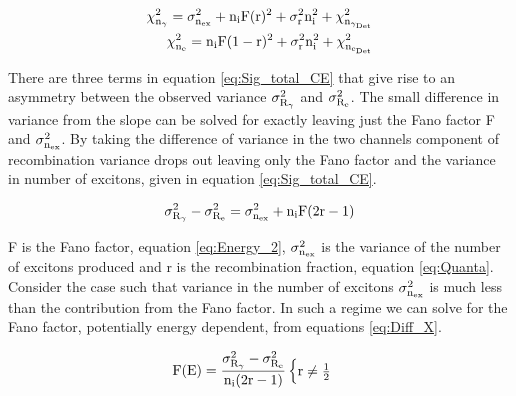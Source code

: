  
\begin{equation}
\begin{split}
\rm \chi_{n_\gamma}^2 = \sigma_{n_{ex}}^2 + n_iF(r)^2 + \sigma_{r}^2 n_i^2 + \chi_{n_{\gamma_{Det}}}^2 \\
\rm \chi_{n_e}^2  = n_iF(1-r)^2 + \sigma_{r}^2 n_i^2 + \chi_{n_{e_{Det}}}^2
\label{eq:Sig_total_CE}
\end{split}
\end{equation}


There are three terms in equation \ref{eq:Sig_total_CE} that give rise to an asymmetry between the observed variance $\rm \sigma_{R_\gamma}^2$  and  $\rm \sigma_{R_e}^2$. The small difference in variance from the slope can be solved for exactly leaving just the Fano factor F and $\rm \sigma_{n_{ex}}^2$. By taking the difference of variance in the two channels component of recombination variance drops out leaving only the Fano factor and the variance in number of excitons, given in equation \ref{eq:Sig_total_CE}.

\begin{equation}
\rm \sigma_{R_\gamma}^2 - \sigma_{R_e}^2 = \sigma_{n_{ex}}^2 + n_iF(2r-1) 
\label{eq:Diff_X}
\end{equation}

F is the Fano factor, equation \ref{eq:Energy_2}, $\rm \sigma_{n_{ex}}^2$ is the variance of the number of excitons produced and r is the recombination fraction, equation \ref{eq:Quanta}. %
Consider the case such that variance in the number of excitons $\rm \sigma_{n_{ex}}^2$ is much less than the contribution from the Fano factor. In such a regime we can solve for the Fano factor, potentially energy dependent, from equations \ref{eq:Diff_X}.

\begin{equation}
\rm F(E)=\frac{\sigma_{R_\gamma}^2 - \sigma_{R_e}^2}{n_i(2r-1)}
\begin{cases} \rm r \neq \frac{1}{2}\\
\end{cases}
\label{eq:Fano}
\end{equation}


